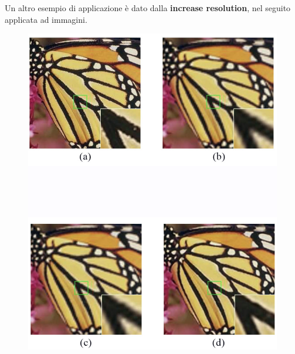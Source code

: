 Un altro esempio di applicazione è dato dalla \textbf{increase resolution}, nel seguito applicata ad immagini.
\begin{figure}[!h]
  \centering
  \includegraphics[scale=.27]{images/autoencoders/increase.png}
\end{figure}
\newpage

